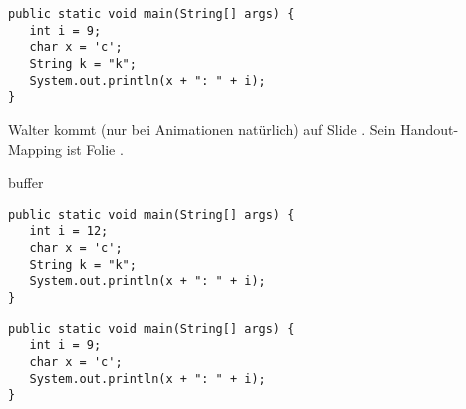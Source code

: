 \documentclass{beamer}
\begin{document}
\begin{frame}[fragile]
\begin{verbatim}
public static void main(String[] args) {
   int i = 9;
   char x = 'c';
   String k = "k";
   System.out.println(x + ": " + i);
}
\end{verbatim}
\endAnimateCode
Walter kommt (nur bei Animationen natürlich) auf Slide \Walter. Sein Handout-Mapping ist Folie \WalterHandout. %
\end{frame}

\begin{frame}
   buffer
\end{frame}

\begin{frame}[fragile]
\begin{verbatim}
public static void main(String[] args) {
   int i = 12;
   char x = 'c';
   String k = "k";
   System.out.println(x + ": " + i);
}
\end{verbatim}
\endAnimateCode
\end{frame}

\begin{frame}[fragile]
\begin{verbatim}
public static void main(String[] args) {
   int i = 9;
   char x = 'c';
   System.out.println(x + ": " + i);
}
\end{verbatim}
\end{frame}
\end{document}
